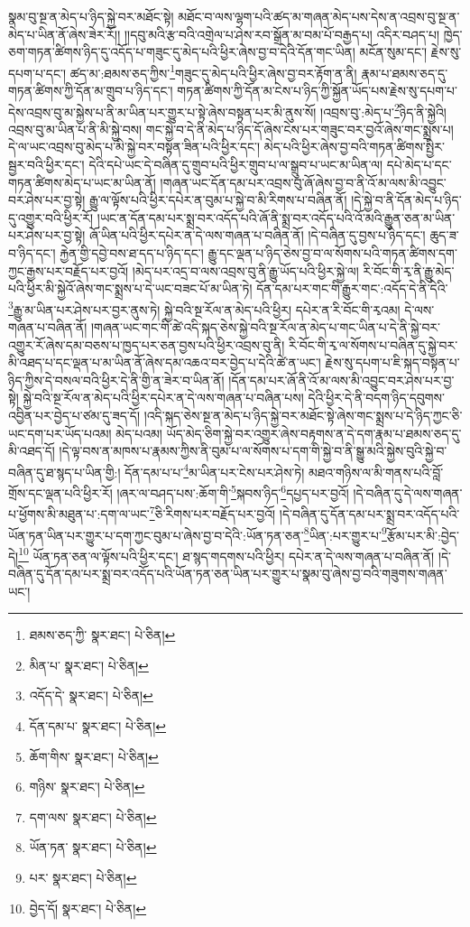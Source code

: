 སྣམ་བུ་སྔ་ན་མེད་པ་ཉིད་སྐྱེ་བར་མཐོང་སྟེ། མཐོང་བ་ལས་ལྷག་པའི་ཚད་མ་གཞན་མེད་པས་དེས་ན་འབྲས་བུ་སྔ་ན་མེད་པ་ཡིན་ནོ་ཞེས་ཟེར་རོ།། །།དབུ་མའི་རྩ་བའི་འགྲེལ་པ་ཤེས་རབ་སྒྲོན་མ་བམ་པོ་བརྒྱད་པ། འདིར་བཤད་པ། ཁྱེད་ཅག་གཏན་ཚིགས་ཉིད་དུ་འདོད་པ་གཟུང་དུ་མེད་པའི་ཕྱིར་ཞེས་བྱ་བ་དེའི་དོན་གང་ཡིན། མངོན་སུམ་དང་། རྗེས་སུ་དཔག་པ་དང་། ཚད་མ་:ཐམས་ཅད་ཀྱིས་\footnote{ཐམས་ཅད་ཀྱི་  སྣར་ཐང་།  པེ་ཅིན། }གཟུང་དུ་མེད་པའི་ཕྱིར་ཞེས་བྱ་བར་རྟོག་ན་ནི། རྣམ་པ་ཐམས་ཅད་དུ་གཏན་ཚིགས་ཀྱི་དོན་མ་གྲུབ་པ་ཉིད་དང་། གཏན་ཚིགས་ཀྱི་དོན་མ་ངེས་པ་ཉིད་ཀྱི་སྐྱོན་ཡོད་པས་རྗེས་སུ་དཔག་པ་དེས་འབྲས་བུ་མ་སྐྱེས་པ་ནི་མ་ཡིན་པར་གྱུར་པ་སྟེ་ཞེས་བསྟན་པར་མི་ནུས་སོ། །འབྲས་བུ་:མེད་པ་\footnote{མིན་པ་  སྣར་ཐང་།  པེ་ཅིན། }ཉིད་ནི་སྐྱེའི། འབྲས་བུ་མ་ཡིན་པ་ནི་མི་སྐྱེ་བས། གང་སྐྱེ་བ་དེ་ནི་མེད་པ་ཉིད་དོ་ཞེས་ངེས་པར་གཟུང་བར་བྱའོ་ཞེས་གང་སྨྲས་པ། དེ་ལ་ཡང་འབྲས་བུ་མེད་པ་མི་སྐྱེ་བར་བསྟན་ཟིན་པའི་ཕྱིར་དང་། མེད་པའི་ཕྱིར་ཞེས་བྱ་བའི་གཏན་ཚིགས་སྤྱིར་སྦྱར་བའི་ཕྱིར་དང་། དེའི་དཔེ་ཡང་དེ་བཞིན་དུ་གྲུབ་པའི་ཕྱིར་གྲུབ་པ་ལ་སྒྲུབ་པ་ཡང་མ་ཡིན་ལ། དཔེ་མེད་པ་དང་གཏན་ཚིགས་མེད་པ་ཡང་མ་ཡིན་ནོ། །གཞན་ཡང་དོན་དམ་པར་འབྲས་བུ་ཞོ་ཞེས་བྱ་བ་ནི་འོ་མ་ལས་མི་འབྱུང་བར་ཤེས་པར་བྱ་སྟེ། རྒྱུ་ལ་ལྟོས་པའི་ཕྱིར་དཔེར་ན་བུམ་པ་སྐྱེ་བ་མི་རིགས་པ་བཞིན་ནོ། །དེ་སྐྱེ་བ་ནི་དོན་མེད་པ་ཉིད་དུ་འགྱུར་བའི་ཕྱིར་རོ། །ཡང་ན་དོན་དམ་པར་སྨྲ་བར་འདོད་པའི་ཞོ་ནི་སྨྲ་བར་འདོད་པའི་འོ་མའི་རྒྱུན་ཅན་མ་ཡིན་པར་ཤེས་པར་བྱ་སྟེ། ཞོ་ཡིན་པའི་ཕྱིར་དཔེར་ན་དེ་ལས་གཞན་པ་བཞིན་ནོ། །དེ་བཞིན་དུ་བྱས་པ་ཉིད་དང་། ཆུད་ཟ་བ་ཉིད་དང་། རྐྱེན་གྱི་དབྱེ་བས་ཐ་དད་པ་ཉིད་དང་། རྒྱུ་དང་ལྡན་པ་ཉིད་ཅེས་བྱ་བ་ལ་སོགས་པའི་གཏན་ཚིགས་དག་ཀྱང་རྒྱས་པར་བརྗོད་པར་བྱའོ། །མེད་པར་འདྲ་བ་ལས་འབྲས་བུ་ནི་རྒྱུ་ཡོད་པའི་ཕྱིར་སྐྱེ་ལ། རི་བོང་གི་རྭ་ནི་རྒྱུ་མེད་པའི་ཕྱིར་མི་སྐྱེའོ་ཞེས་གང་སྨྲས་པ་དེ་ཡང་བཟང་པོ་མ་ཡིན་ཏེ། དོན་དམ་པར་གང་གི་རྒྱུར་གང་:འདོད་དེ་ནི་དེའི་\footnote{འདོད་དེ་  སྣར་ཐང་།  པེ་ཅིན། }རྒྱུ་མ་ཡིན་པར་ཤེས་པར་བྱར་ནུས་ཏེ། སྐྱེ་བའི་སྔ་རོལ་ན་མེད་པའི་ཕྱིར། དཔེར་ན་རི་བོང་གི་རྭའམ། དེ་ལས་གཞན་པ་བཞིན་ནོ། །གཞན་ཡང་གང་གི་ཚེ་འདི་སྐད་ཅེས་སྐྱེ་བའི་སྔ་རོལ་ན་མེད་པ་གང་ཡིན་པ་དེ་ནི་སྐྱེ་བར་འགྱུར་རོ་ཞེས་དམ་བཅས་པ་ཁྱད་པར་ཅན་བྱས་པའི་ཕྱིར་འབྲས་བུ་ནི། རི་བོང་གི་རྭ་ལ་སོགས་པ་བཞིན་དུ་སྐྱེ་བར་མི་འཐད་པ་དང་ལྡན་པ་མ་ཡིན་ནོ་ཞེས་དམ་འཆའ་བར་བྱེད་པ་དེའི་ཚེ་ན་ཡང་། རྗེས་སུ་དཔག་པ་ཇི་སྐད་བསྟན་པ་ཉིད་ཀྱིས་དེ་བསལ་བའི་ཕྱིར་དེ་ནི་གྱི་ན་ཟེར་བ་ཡིན་ནོ། །དོན་དམ་པར་ཞོ་ནི་འོ་མ་ལས་མི་འབྱུང་བར་ཤེས་པར་བྱ་སྟེ། སྐྱེ་བའི་སྔ་རོལ་ན་མེད་པའི་ཕྱིར་དཔེར་ན་དེ་ལས་གཞན་པ་བཞིན་པས། དེའི་ཕྱིར་དེ་ནི་བདག་ཉིད་དབུགས་འབྱིན་པར་བྱེད་པ་ཙམ་དུ་ཟད་དོ། །འདི་སྐད་ཅེས་སྔ་ན་མེད་པ་ཉིད་སྐྱེ་བར་མཐོང་སྟེ་ཞེས་གང་སྨྲས་པ་དེ་ཉིད་ཀྱང་ཅི་ཡང་དག་པར་ཡོད་པའམ། མེད་པའམ། ཡོད་མེད་ཅིག་སྐྱེ་བར་འགྱུར་ཞེས་བརྟགས་ན་དེ་དག་རྣམ་པ་ཐམས་ཅད་དུ་མི་འཐད་དོ། །དེ་ལྟ་བས་ན་མཁས་པ་རྣམས་ཀྱིས་ནི་བུམ་པ་ལ་སོགས་པ་དག་གི་སྐྱེ་བ་ནི་སྒྱུ་མའི་སྐྱེས་བུའི་སྐྱེ་བ་བཞིན་དུ་ཐ་སྙད་པ་ཡིན་གྱི:། དོན་དམ་པ་པ་\footnote{དོན་དམ་པ་  སྣར་ཐང་།  པེ་ཅིན། }མ་ཡིན་པར་ངེས་པར་ཤེས་ཏེ། མཐའ་གཉིས་ལ་མི་གནས་པའི་བློ་གྲོས་དང་ལྡན་པའི་ཕྱིར་རོ། །ཞར་ལ་བཤད་པས་:ཆོག་གི་\footnote{ཆོག་གིས་  སྣར་ཐང་།  པེ་ཅིན། }སྐབས་ཉིད་\footnote{གཉིས་  སྣར་ཐང་།  པེ་ཅིན། }དཔྱད་པར་བྱའོ། །དེ་བཞིན་དུ་དེ་ལས་གཞན་པ་ཕྱོགས་མི་མཐུན་པ་:དག་ལ་ཡང་\footnote{དག་ལས་  སྣར་ཐང་།  པེ་ཅིན། }ཅི་རིགས་པར་བརྗོད་པར་བྱའོ། །དེ་བཞིན་དུ་དོན་དམ་པར་སྨྲ་བར་འདོད་པའི་ཡོན་ཏན་ཡིན་པར་གྱུར་པ་དག་ཀྱང་བུམ་པ་ཞེས་བྱ་བ་དེའི་:ཡོན་ཏན་ཅན་\footnote{ཡོན་ཏན་  སྣར་ཐང་།  པེ་ཅིན། }ཡིན་:པར་གྱུར་པ་\footnote{པར་  སྣར་ཐང་།  པེ་ཅིན། }རྩོམ་པར་མི་:བྱེད་དེ།\footnote{བྱེད་དོ།  སྣར་ཐང་།  པེ་ཅིན། } ཡོན་ཏན་ཅན་ལ་ལྟོས་པའི་ཕྱིར་དང་། ཐ་སྙད་གདགས་པའི་ཕྱིར། དཔེར་ན་དེ་ལས་གཞན་པ་བཞིན་ནོ། །དེ་བཞིན་དུ་དོན་དམ་པར་སྨྲ་བར་འདོད་པའི་ཡོན་ཏན་ཅན་ཡིན་པར་གྱུར་པ་སྣམ་བུ་ཞེས་བྱ་བའི་གཟུགས་གཞན་ཡང་། 